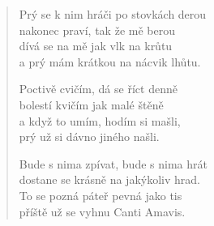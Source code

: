 \begin{multicols}{2}
\begin{verse}
\columnbreak

Prý se k nim hráči po stovkách derou\\
nakonec praví, tak že mě berou\\
dívá se na mě jak vlk na krůtu\\
a prý mám krátkou na nácvik lhůtu.

Poctivě cvičím, dá se říct denně\\
bolestí kvičím jak malé štěně\\
a když to umím, hodím si mašli,\\
prý už si dávno jiného našli.

Bude s nima zpívat, bude s nima hrát\\
dostane se krásně na jakýkoliv hrad.\\
To se pozná páteř pevná jako tis\\
příště už se vyhnu Canti Amavis.

\end{verse}


\end{multicols}